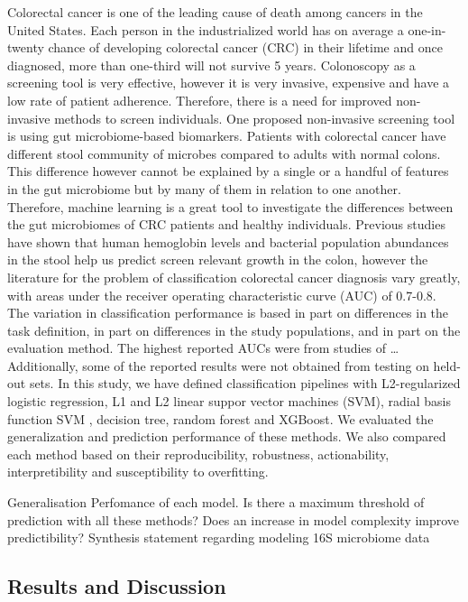 \documentclass[11pt,]{article}
\begin{document}
Colorectal cancer is one of the leading cause of death among cancers in
the United States. Each person in the industrialized world has on
average a one-in-twenty chance of developing colorectal cancer (CRC) in
their lifetime and once diagnosed, more than one-third will not survive
5 years. Colonoscopy as a screening tool is very effective, however it
is very invasive, expensive and have a low rate of patient adherence.
Therefore, there is a need for improved non-invasive methods to screen
individuals. One proposed non-invasive screening tool is using gut
microbiome-based biomarkers. Patients with colorectal cancer have
different stool community of microbes compared to adults with normal
colons. This difference however cannot be explained by a single or a
handful of features in the gut microbiome but by many of them in
relation to one another. Therefore, machine learning is a great tool to
investigate the differences between the gut microbiomes of CRC patients
and healthy individuals. Previous studies have shown that human
hemoglobin levels and bacterial population abundances in the stool help
us predict screen relevant growth in the colon, however the literature
for the problem of classification colorectal cancer diagnosis vary
greatly, with areas under the receiver operating characteristic curve
(AUC) of 0.7-0.8. The variation in classification performance is based
in part on differences in the task definition, in part on differences in
the study populations, and in part on the evaluation method. The highest
reported AUCs were from studies of \ldots{} Additionally, some of the
reported results were not obtained from testing on held-out sets. In
this study, we have defined classification pipelines with L2-regularized
logistic regression, L1 and L2 linear suppor vector machines (SVM),
radial basis function SVM , decision tree, random forest and XGBoost. We
evaluated the generalization and prediction performance of these
methods. We also compared each method based on their reproducibility,
robustness, actionability, interpretibility and susceptibility to
overfitting.

Generalisation Perfomance of each model. Is there a maximum threshold of
prediction with all these methods? Does an increase in model complexity
improve predictibility? Synthesis statement regarding modeling 16S
microbiome data

\subsection{Results and Discussion}\label{results-and-discussion}
\end{document}
